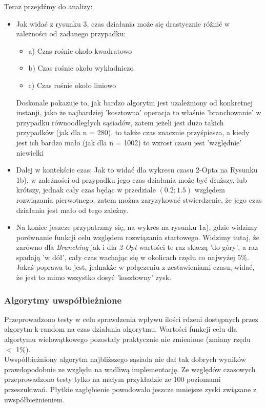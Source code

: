 \documentclass{article}
\begin{document}
Teraz przejdźmy do analizy:
\begin{itemize}
	\item Jak widać z rysunku 3, czas działania może się drastycznie różnić w zależności od zadanego przypadku:
	\begin{itemize}
		\item a) Czas rośnie około kwadratowo
		\item b) Czas rośnie około wykładniczo
		\item c) Czas rośnie około liniowo
	\end{itemize}
	Doskonale pokazuje to, jak bardzo algorytm jest uzależniony od konkretnej instanji, jako że najbardziej 'kosztowna' operacja to właśnie 'branchowanie' w przypadku równoodległych sąsiadów, zatem jeżeli jest dużo takich przypadków (jak dla n = 280), to także czas znacznie przyśpiesza, a kiedy jest ich bardzo mało (jak dla n = 1002) to wzrost czasu jest 'względnie' niewielki
	\item Dalej w kontekście czas: Jak to widać dla wykresu czasu 2-Opta na Rysunku 1b), w zależności od przypadku jego czas działania może być dłuższy, lub krótszy, jednak cały czas będąc w przedziale $(0.2; 1.5)$ względem rozwiązania pierwotnego, zatem można zaryzykować stwierdzenie, że jego czas działania jest mało od tego zależny.
	\item Na koniec jeszcze przypatrzmy się, na wykres na rysunku 1a), gdzie widzimy porównanie funkcji celu względem rozwiązania startowego. Widzimy tutaj, że zarówno dla \textit{Branching} jak i dla \textit{2-Opt} wartości te raz skaczą 'do góry', a raz spadają 'w dół', cały czas wachając się w okolicach rzędu co najwyżej 5\%. Jakaś poprawa to jest, jednakże  w połączeniu z zestawieniami czasu, widać, że jest to mimo wszystko dosyć 'kosztowny' zysk.
\end{itemize}

\newpage
\subsubsection{Algorytmy uwspółbieżnione}

Przeprowadzono testy w celu sprawdzenia wpływu ilości rdzeni dostępnych przez algorytm k-random na czas działania algorytmu. Wartości funkcji celu dla algortymu wielowątkowego pozostały praktycznie nie zmienione (zmiany rzędu $<$ 1\%).\\
Uwspółbieżniony algorytm najbliższego sąsiada nie dał tak dobrych wyników prawdopodobnie ze względu na wadliwą implementację. Ze względów czasowych przeprowadzono testy tylko na małym przykładzie ze 100 poziomami przeszukiwań. Płytkie zagłębienie powodowało jeszcze mniejsze zyski związane z uwspółbieżnieniem.
\end{document}
